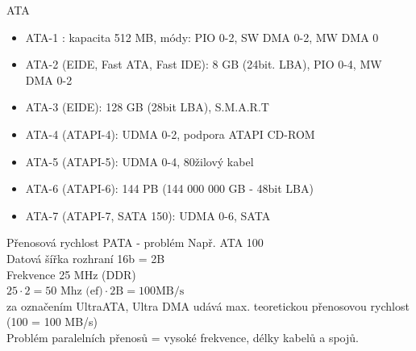 \documentclass[aspectratio=43]{beamer}
\begin{document}
\begin{frame}{ATA}
	\begin{itemize}
		\item ATA-1 : kapacita 512 MB, módy: PIO 0-2, SW DMA 0-2, MW DMA 0 
		\item ATA-2 (EIDE, Fast ATA, Fast IDE): 8 GB (24bit. LBA), PIO 0-4, MW DMA 0-2 
		\item ATA-3 (EIDE): 128 GB (28bit LBA), S.M.A.R.T 
		\item ATA-4 (ATAPI-4): UDMA 0-2, podpora ATAPI CD-ROM 
		\item ATA-5 (ATAPI-5): UDMA 0-4, 80žilový kabel 
		\item ATA-6 (ATAPI-6): 144 PB (144 000 000 GB - 48bit LBA) 
		\item ATA-7 (ATAPI-7, SATA 150): UDMA 0-6, SATA
	\end{itemize}
	
\end{frame}


\begin{frame}{Přenosová rychlost PATA - problém}
	Např. ATA 100 \\
	Datová šířka rozhraní 16b = 2B \\
	Frekvence 25 MHz (DDR) \\
	$25 \cdot 2 = 50 \text{ Mhz (ef)} \cdot 2\text{B} = 100 \text{MB/s}$ \\
	 za označením UltraATA, Ultra DMA udává max. 
	teoretickou přenosovou rychlost (100 = 100 MB/s) 
	\\
	Problém paralelních přenosů = vysoké frekvence, 
	délky kabelů a spojů.
	
\end{frame}
\end{document}
